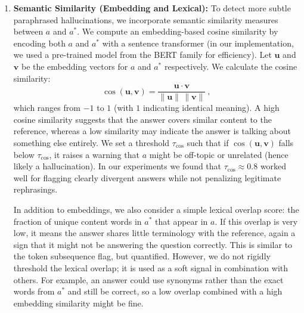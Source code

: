\documentclass{article}
\begin{document}
\begin{enumerate}
    \item \textbf{Semantic Similarity (Embedding and Lexical):} To detect more subtle paraphrased hallucinations, we incorporate semantic similarity measures between $a$ and $a^*$. We compute an embedding-based cosine similarity by encoding both $a$ and $a^*$ with a sentence transformer (in our implementation, we used a pre-trained model from the BERT family for efficiency). Let $\mathbf{u}$ and $\mathbf{v}$ be the embedding vectors for $a$ and $a^*$ respectively. We calculate the cosine similarity:
    \[
    \cos(\mathbf{u}, \mathbf{v}) = \frac{\mathbf{u} \cdot \mathbf{v}}{\|\mathbf{u}\|\,\|\mathbf{v}\|}~,
    \] 
    which ranges from $-1$ to $1$ (with $1$ indicating identical meaning). A high cosine similarity suggests that the answer covers similar content to the reference, whereas a low similarity may indicate the answer is talking about something else entirely. We set a threshold $\tau_{\cos}$ such that if $\cos(\mathbf{u},\mathbf{v})$ falls below $\tau_{\cos}$, it raises a warning that $a$ might be off-topic or unrelated (hence likely a hallucination). In our experiments we found that $\tau_{\cos} \approx 0.8$ worked well for flagging clearly divergent answers while not penalizing legitimate rephrasings.
    
    In addition to embeddings, we also consider a simple lexical overlap score: the fraction of unique content words in $a^*$ that appear in $a$. If this overlap is very low, it means the answer shares little terminology with the reference, again a sign that it might not be answering the question correctly. This is similar to the token subsequence flag, but quantified. However, we do not rigidly threshold the lexical overlap; it is used as a soft signal in combination with others. For example, an answer could use synonyms rather than the exact words from $a^*$ and still be correct, so a low overlap combined with a high embedding similarity might be fine.
    

\end{enumerate}
\end{document}
